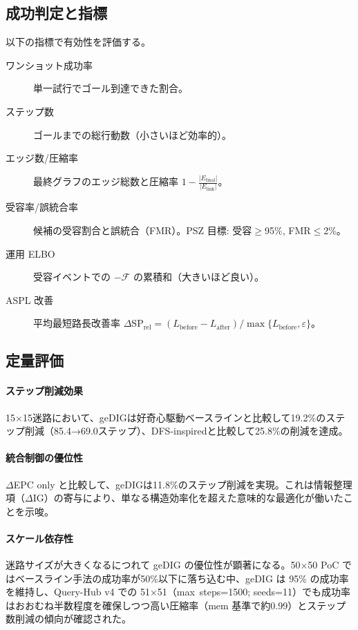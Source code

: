 \documentclass[ja=standard,xelatex]{bxjsarticle}
\newcommand{\F}{\mathcal{F}}
\begin{document}
\subsection{成功判定と指標}
\label{sec:maze_success_metrics}
以下の指標で有効性を評価する。
\begin{description}
  \item[ワンショット成功率] 単一試行でゴール到達できた割合。
  \item[ステップ数] ゴールまでの総行動数（小さいほど効率的）。
  \item[エッジ数/圧縮率] 最終グラフのエッジ総数と圧縮率 $1-\frac{|E_{\mathrm{final}}|}{|E_{\mathrm{link}}|}$。
  \item[受容率/誤統合率] 候補の受容割合と誤統合（FMR）。PSZ 目標: 受容$\ge$95\%, FMR$\le$2\%。
  \item[運用 ELBO] 受容イベントでの $-\F$ の累積和（大きいほど良い）。
  \item[ASPL 改善] 平均最短路長改善率 $\Delta\mathrm{SP}_{\mathrm{rel}}=(L_{\mathrm{before}}-L_{\mathrm{after}})/\max\{L_{\mathrm{before}},\varepsilon\}$。
\end{description}

\subsection{定量評価}

\paragraph{ステップ削減効果}
15×15迷路において、geDIGは好奇心駆動ベースラインと比較して19.2\%のステップ削減（85.4→69.0ステップ）、DFS-inspiredと比較して25.8\%の削減を達成。

\paragraph{統合制御の優位性}
$\Delta$EPC only と比較して、geDIGは11.8\%のステップ削減を実現。これは情報整理項（$\Delta$IG）の寄与により、単なる構造効率化を超えた意味的な最適化が働いたことを示唆。

\paragraph{スケール依存性}
迷路サイズが大きくなるにつれて geDIG の優位性が顕著になる。50×50 PoC ではベースライン手法の成功率が50\%以下に落ち込む中、geDIG は 95\% の成功率を維持し、Query-Hub v4 での 51×51（max~steps=1500; seeds=11）でも成功率はおおむね半数程度を確保しつつ高い圧縮率（mem 基準で約0.99）とステップ数削減の傾向が確認された。
\end{document}
